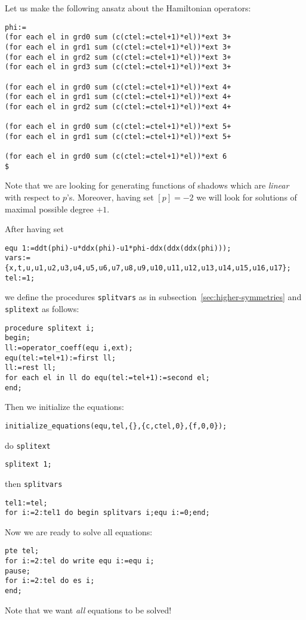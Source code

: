 \documentclass[12pt]{amsart}
\theoremstyle{definition}
\begin{document}
Let us make the following ansatz about the Hamiltonian operators:
\begin{verbatim}
phi:=
(for each el in grd0 sum (c(ctel:=ctel+1)*el))*ext 3+
(for each el in grd1 sum (c(ctel:=ctel+1)*el))*ext 3+
(for each el in grd2 sum (c(ctel:=ctel+1)*el))*ext 3+
(for each el in grd3 sum (c(ctel:=ctel+1)*el))*ext 3+

(for each el in grd0 sum (c(ctel:=ctel+1)*el))*ext 4+
(for each el in grd1 sum (c(ctel:=ctel+1)*el))*ext 4+
(for each el in grd2 sum (c(ctel:=ctel+1)*el))*ext 4+

(for each el in grd0 sum (c(ctel:=ctel+1)*el))*ext 5+
(for each el in grd1 sum (c(ctel:=ctel+1)*el))*ext 5+

(for each el in grd0 sum (c(ctel:=ctel+1)*el))*ext 6
$
\end{verbatim}
Note that we are looking for generating functions of shadows which are
\emph{linear} with respect to $p$'s. Moreover, having set $[p]=-2$ we will look
for solutions of maximal possible degree $+1$.

After having set
\begin{verbatim}
equ 1:=ddt(phi)-u*ddx(phi)-u1*phi-ddx(ddx(ddx(phi)));
vars:={x,t,u,u1,u2,u3,u4,u5,u6,u7,u8,u9,u10,u11,u12,u13,u14,u15,u16,u17};
tel:=1;
\end{verbatim}
we define the procedures \texttt{splitvars} as in
subsection~\ref{sec:higher-symmetries} and \texttt{splitext} as follows:
\begin{verbatim}
procedure splitext i;
begin;
ll:=operator_coeff(equ i,ext);
equ(tel:=tel+1):=first ll;
ll:=rest ll;
for each el in ll do equ(tel:=tel+1):=second el;
end;
\end{verbatim}
Then we initialize the equations:
\begin{verbatim}
initialize_equations(equ,tel,{},{c,ctel,0},{f,0,0});
\end{verbatim}
do \texttt{splitext}
\begin{verbatim}
splitext 1;
\end{verbatim}
then \texttt{splitvars}
\begin{verbatim}
tel1:=tel;
for i:=2:tel1 do begin splitvars i;equ i:=0;end;
\end{verbatim}
Now we are ready to solve all equations:
\begin{verbatim}
pte tel;
for i:=2:tel do write equ i:=equ i;
pause;
for i:=2:tel do es i;
end;
\end{verbatim}
Note that we want \emph{all} equations to be solved!
\end{document}
